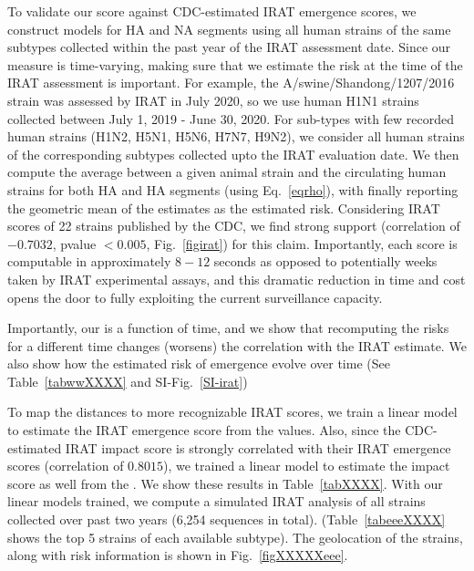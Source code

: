\documentclass[onecolumn, compsoc,10pt]{IEEEtran}
\begin{document}
To validate our score against CDC-estimated IRAT emergence scores, we construct \enet models for HA and NA segments using all human strains of the same  subtypes collected within the past year of the IRAT assessment date. Since our measure is time-varying, making sure that we estimate the risk at the time of the IRAT assessment is important. For example, the A/swine/Shandong/1207/2016 strain was assessed by IRAT in July 2020, so we  use human H1N1 strains collected  between July 1, 2019 - June 30, 2020. For sub-types with few recorded human strains (H1N2, H5N1, H5N6, H7N7, H9N2), we consider all human strains of the corresponding subtypes collected upto the IRAT evaluation date. We then compute the average \qdist between a given animal  strain  and the circulating human strains for both HA and HA segments (using Eq.~\eqref{eqrho}), with finally reporting the geometric mean of the estimates as the estimated risk. Considering IRAT scores of 22 strains published by the CDC, we find strong support  (correlation of $-0.7032$, pvalue $< 0.005$, Fig.~\ref{figirat}) for this claim. Importantly, each \erisk score  is  computable in approximately $8-12$ seconds as opposed to potentially weeks taken by IRAT experimental assays, and this dramatic reduction in time and cost  opens the door to fully exploiting the  current surveillance capacity.

Importantly, our \erisk is a function of time, and
we show that recomputing the risks for a different time changes (worsens) the correlation with the IRAT estimate. We also show how the estimated  risk of emergence evolve over time (See Table~\ref{tabwwXXXX}  and SI-Fig.~\ref{SI-irat})

To map the \enet distances to more recognizable IRAT scores, we  train a linear model to estimate the IRAT emergence score from the \erisk values. Also, since the CDC-estimated IRAT impact score is strongly correlated with their IRAT emergence scores (correlation of $0.8015$), we  trained a linear model to estimate the impact score as well from the  \erisk. We show these results in Table~\ref{tabXXXX}. With our linear models trained, we compute a simulated IRAT analysis of all \infl strains collected over past two years (6,254 sequences in total). (Table~\ref{tabeeeXXXX} shows the top 5 strains of each available subtype). The geolocation of the strains, along with risk information is shown in Fig.~\ref{figXXXXXeee}.


\end{document}
